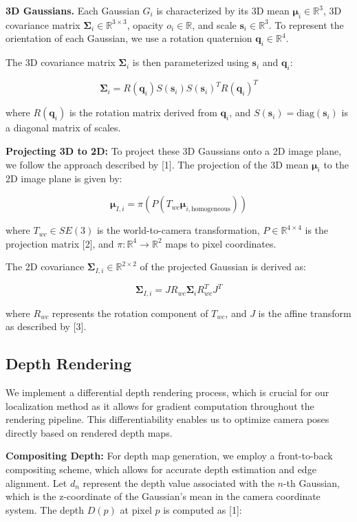 \documentclass[twocolumn]{article} %
\begin{document}
\textbf{3D Gaussians.} Each Gaussian \(G_i\) is characterized by its 3D
mean \(\boldsymbol{\mu}_i \in \mathbb{R}^3\), 3D covariance matrix
\(\boldsymbol{\Sigma}_i \in \mathbb{R}^{3\times3}\), opacity
\(o_i \in \mathbb{R}\), and scale \(\mathbf{s}_i \in \mathbb{R}^3\). To
represent the orientation of each Gaussian, we use a rotation quaternion
\(\mathbf{q}_i \in \mathbb{R}^4\).

The 3D covariance matrix \(\boldsymbol{\Sigma}_i\) is then parameterized
using \(\mathbf{s}_i\) and \(\mathbf{q}_i\):

\[\boldsymbol{\Sigma}_i = R(\mathbf{q}_i) S(\mathbf{s}_i) S(\mathbf{s}_i)^T R(\mathbf{q}_i)^T\]

where \(R(\mathbf{q}_i)\) is the rotation matrix derived from
\(\mathbf{q}_i\), and \(S(\mathbf{s}_i) = \text{diag}(\mathbf{s}_i)\) is
a diagonal matrix of scales.

\textbf{Projecting 3D to 2D:} To project these 3D Gaussians onto a 2D
image plane, we follow the approach described by {[}1{]}. The projection
of the 3D mean \(\boldsymbol{\mu}_i\) to the 2D image plane is given by:

\[\boldsymbol{\mu}_{I,i} = \pi(P(T_{wc} \boldsymbol{\mu}_{i,\text{homogeneous}}))\]

where \(T_{wc} \in SE(3)\) is the world-to-camera transformation,
\(P \in \mathbb{R}^{4 \times 4}\) is the projection matrix {[}2{]}, and
\(\pi: \mathbb{R}^4 \rightarrow \mathbb{R}^2\) maps to pixel
coordinates.

The 2D covariance
\(\boldsymbol{\Sigma}_{I,i} \in \mathbb{R}^{2\times2}\) of the projected
Gaussian is derived as:

\[\boldsymbol{\Sigma}_{I,i} = J R_{wc} \boldsymbol{\Sigma}_i R_{wc}^T J^T\]

where \(R_{wc}\) represents the rotation component of \(T_{wc}\), and
\(J\) is the affine transform as described by {[}3{]}.

\subsection{Depth Rendering}\label{depth-rendering}

We implement a differential depth rendering process, which is crucial
for our localization method as it allows for gradient computation
throughout the rendering pipeline. This differentiability enables us to
optimize camera poses directly based on rendered depth maps.

\textbf{Compositing Depth:} For depth map generation, we employ a
front-to-back compositing scheme, which allows for accurate depth
estimation and edge alignment. Let \(d_n\) represent the depth value
associated with the \(n\)-th Gaussian, which is the z-coordinate of the
Gaussian's mean in the camera coordinate system. The depth \(D(p)\) at
pixel \(p\) is computed as {[}1{]}:
\end{document}
